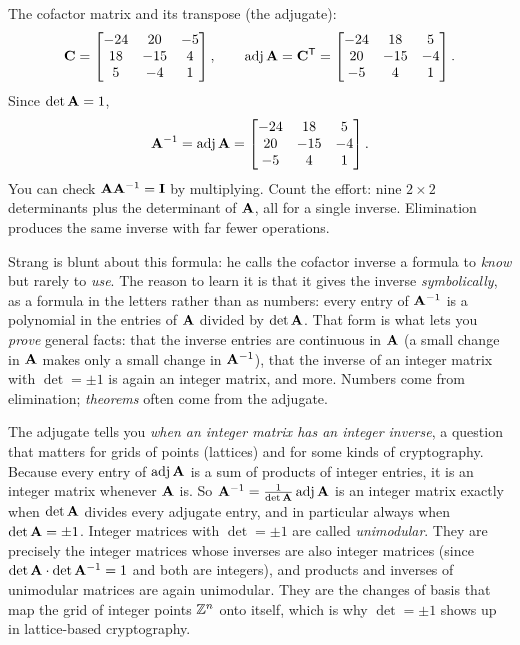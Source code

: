 The cofactor matrix and its transpose (the adjugate):
\[
\mathbf{C}=\begin{bmatrix} -24 & 20 & -5 \\ 18 & -15 & 4 \\ 5 & -4 & 1\end{bmatrix},
\qquad
\operatorname{adj}\mathbf{A}=\mathbf{C}^{\mathsf{T}}=\begin{bmatrix} -24 & 18 & 5 \\ 20 & -15 & -4 \\ -5 & 4 & 1\end{bmatrix}.
\]
Since $\det\mathbf{A}=1$,
\[
\mathbf{A}^{-1}=\operatorname{adj}\mathbf{A}=\begin{bmatrix} -24 & 18 & 5 \\ 20 & -15 & -4 \\ -5 & 4 & 1\end{bmatrix}.
\]
You can check $\mathbf{A}\mathbf{A}^{-1}=\mathbf{I}$ by multiplying. Count the effort: nine $2\times2$
determinants plus the determinant of $\mathbf{A}$, all for a single inverse. Elimination produces the
same inverse with far fewer operations.

\begin{strangbox}
Strang is blunt about this formula: he calls the cofactor inverse a formula to
\emph{know} but rarely to \emph{use}. The reason to learn it is that it gives the inverse
\emph{symbolically}, as a formula in the letters rather than as numbers: every entry of $\mathbf{A}^{-1}$
is a polynomial in the entries of $\mathbf{A}$ divided by $\det\mathbf{A}$. That form is what lets you
\emph{prove} general facts: that the inverse entries are continuous in $\mathbf{A}$ (a small change in
$\mathbf{A}$ makes only a small change in $\mathbf{A}^{-1}$), that the inverse of an integer matrix with
$\det=\pm1$ is again an integer matrix, and more. Numbers come from elimination; \emph{theorems}
often come from the adjugate.
\end{strangbox}

\begin{connectionbox}
The adjugate tells you \emph{when an integer matrix has an integer inverse}, a question that matters
for grids of points (lattices) and for some kinds of cryptography. Because every entry of
$\operatorname{adj}\mathbf{A}$ is a sum of products of integer entries, it is an integer matrix whenever
$\mathbf{A}$ is. So $\mathbf{A}^{-1}=\frac{1}{\det\mathbf{A}}\operatorname{adj}\mathbf{A}$ is an integer matrix exactly
when $\det\mathbf{A}$ divides every adjugate entry, and in particular always when $\det\mathbf{A}=\pm1$.
Integer matrices with $\det=\pm1$ are called \emph{unimodular}. They are precisely the integer
matrices whose inverses are also integer matrices (since $\det\mathbf{A}\cdot\det\mathbf{A}^{-1}=1$ and both
are integers), and products and inverses of unimodular matrices are again unimodular. They are the
changes of basis that map the grid of integer points $\mathbb{Z}^n$ onto itself, which is why $\det=\pm1$
shows up in lattice-based cryptography.
\end{connectionbox}

